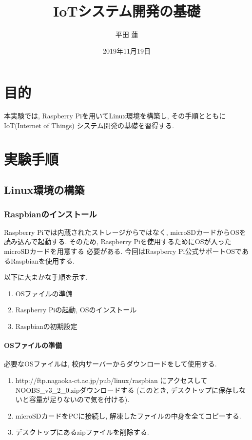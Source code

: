 \documentclass[titlepage]{jsarticle}
\title{IoTシステム開発の基礎}
\author{平田 蓮}
\date{2019年11月19日}
\begin{document}
\maketitle
\section{目的}
    本実験では, Raspberry Piを用いてLinux環境を構築し, その手順とともにIoT(Internet of Things)
    システム開発の基礎を習得する.

\section{実験手順}
    \subsection{Linux環境の構築}
        \subsubsection{Raspbianのインストール}
            Raspberry Piでは内蔵されたストレージからではなく,
            microSDカードからOSを読み込んで起動する.
            そのため, Raspberry Piを使用するためにOSが入ったmicroSDカードを用意する
            必要がある. 今回はRaspberry Pi公式サポートOSであるRaspbianを使用する.

            以下に大まかな手順を示す.

            \begin{enumerate}
                \item OSファイルの準備
                \item Raspberry Piの起動, OSのインストール
                \item Raspbianの初期設定
            \end{enumerate}

            \paragraph{OSファイルの準備}
                必要なOSファイルは, 校内サーバーからダウンロードをして使用する.

                \begin{enumerate}
                    \item http://ftp.nagaoka-ct.ac.jp/pub/linux/raspbian
                        にアクセスしてNOOBS\_v3\_2\_0.zipダウンロードする
                        (このとき, デスクトップに保存しないと容量が足りないので気を付ける).
                    \item microSDカードをPCに接続し, 解凍したファイルの中身を全てコピーする.
                    \item デスクトップにあるzipファイルを削除する.
                \end{enumerate}
\end{document}

